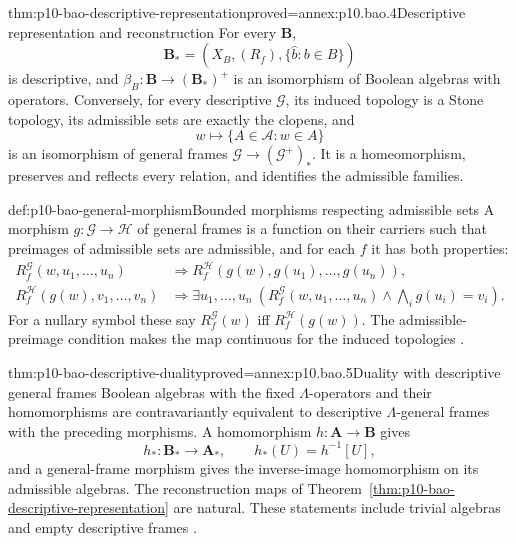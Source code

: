 \begin{hbtheorem}{thm:p10-bao-descriptive-representation}{proved=annex:p10.bao.4}{Descriptive representation and reconstruction}
For every \(\mathbf B\),
\[
 \mathbf B_*=(X_B,(R_f),\{\widehat b:b\in B\})
\]
is descriptive, and \(\beta_B:\mathbf B\to(\mathbf B_*)^+\)
is an isomorphism of Boolean algebras with operators.
Conversely, for every descriptive \(\mathcal G\), its induced
topology is a Stone topology, its admissible sets are exactly
the clopens, and
\[
 w\longmapsto\{A\in\mathcal A:w\in A\}
\]
is an isomorphism of general frames
\(\mathcal G\to(\mathcal G^+)_*\).
It is a homeomorphism, preserves and reflects every relation,
and identifies the admissible families.
\end{hbtheorem}

\begin{hbdefinition}{def:p10-bao-general-morphism}{Bounded morphisms respecting admissible sets}
A morphism \(g:\mathcal G\to\mathcal H\) of general frames is a
function on their carriers such that preimages of admissible
sets are admissible, and for each \(f\) it has both properties:
\[
\begin{aligned}
 R_f^{\mathcal G}(w,u_1,\ldots,u_n)
   &\Longrightarrow
     R_f^{\mathcal H}(g(w),g(u_1),\ldots,g(u_n)),\\
 R_f^{\mathcal H}(g(w),v_1,\ldots,v_n)
   &\Longrightarrow
     \exists u_1,\ldots,u_n\
       \left(R_f^{\mathcal G}(w,u_1,\ldots,u_n)
                 \land\bigwedge_i g(u_i)=v_i\right).
\end{aligned}
\]
For a nullary symbol these say
\(R_f^{\mathcal G}(w)\) iff \(R_f^{\mathcal H}(g(w))\).
The admissible-preimage condition makes the map continuous for
the induced topologies
\cite[preprint Definition~5.27, p.~23]{Venema2005Preprint}.
\end{hbdefinition}

\begin{hbtheorem}{thm:p10-bao-descriptive-duality}{proved=annex:p10.bao.5}{Duality with descriptive general frames}
Boolean algebras with the fixed \(\Lambda\)-operators and their
homomorphisms are contravariantly equivalent to descriptive
\(\Lambda\)-general frames with the preceding morphisms.
A homomorphism \(h:\mathbf A\to\mathbf B\) gives
\[
 h_*:\mathbf B_*\to\mathbf A_*,
 \qquad h_*(U)=h^{-1}[U],
\]
and a general-frame morphism gives the inverse-image
homomorphism on its admissible algebras.
The reconstruction maps of
Theorem~\ref{thm:p10-bao-descriptive-representation} are natural.
These statements include trivial algebras and empty descriptive
frames \cite[preprint Proposition~5.18 and Theorem~5.28,
pp.~21, 23]{Venema2005Preprint}.
\end{hbtheorem}
